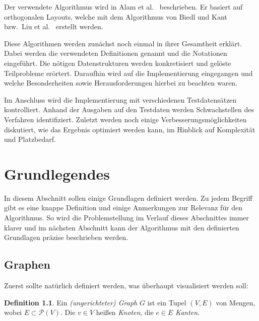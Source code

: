 \documentclass[a4paper]{scrreprt}
\theoremstyle{definition}
\newtheorem{definition}[satz]{Definition}
\begin{document}
Der verwendete Algorithmus wird in Alam et al.~\cite{smooth-13} beschrieben. Er basiert auf orthogonalen
Layouts, welche mit dem Algorithmus von Biedl und Kant~\cite{biedl+kant-98} bzw.\ Liu et al.~\cite{liu+etal-98} erstellt
werden.

Diese Algorithmen werden zunächst noch einmal in ihrer Gesamtheit erklärt. Dabei werden die
verwendeten Definitionen genannt und die Notationen eingeführt. Die nötigen Datenstrukturen
werden konkretisiert und gelöste Teilprobleme erörtert. Daraufhin wird auf die Implementierung eingegangen und welche Besonderheiten sowie Herausforderungen hierbei zu
beachten waren. 

Im Anschluss wird die Implementierung mit verschiedenen Testdatensätzen kontrolliert. Anhand
der Ausgaben auf den Testdaten werden Schwachstellen des Verfahren identifiziert. 
Zuletzt werden noch einige Verbesserungsmöglichkeiten diskutiert, wie das Ergebnis
optimiert werden kann, im Hinblick auf Komplexität und Platzbedarf.








\chapter{Grundlegendes}
\label{chap:basics}

In diesem Abschnitt sollen einige Grundlagen definiert werden. Zu jedem Begriff gibt es eine knappe Definition und einige Anmerkungen zur Relevanz für den Algorithmus. So wird die Problemstellung im Verlauf dieses Abschnittes immer klarer und im nächsten Abschnitt kann der Algorithmus mit den definierten Grundlagen präzise beschrieben werden.

\section{Graphen}

Zuerst sollte natürlich definiert werden, was überhaupt visualisiert werden soll:

\begin{definition}
  Ein \emph{(ungerichteter) Graph} $G$ ist ein Tupel $(V, E)$ von Mengen, wobei $E \subset \mathcal{P}(V)$.
  Die $v \in V$ heißen \emph{Knoten}, die $e \in E$ \emph{Kanten}.
\end{definition}
\end{document}
